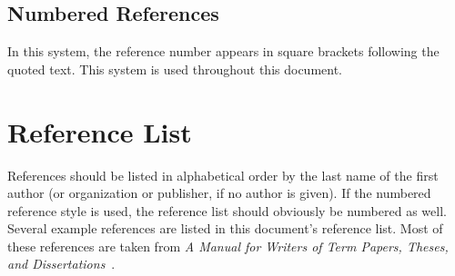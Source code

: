 \subsection{Numbered References}

In this system, the reference number appears in square brackets
following the quoted text.  This system is used throughout this
document.

\section{Reference List}

References should be listed in alphabetical order by the last name of
the first author (or organization or publisher, if no author is
given).  If the numbered reference style is used, the reference list
should obviously be numbered as well.  Several example references are
listed in this document's reference list.  Most of these references
are taken from \textit{A Manual for Writers of Term Papers, Theses, and
Dissertations}~\cite{Turabian}.

